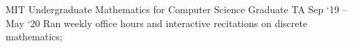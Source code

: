 \experience
    {MIT Undergraduate Mathematics for Computer Science}
    {Graduate TA}
    {Sep `19 -- May `20}
    {
        Ran weekly office hours and interactive recitations on discrete mathematics;
    }
